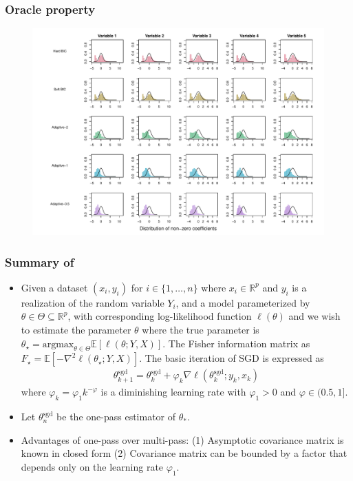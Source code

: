 \documentclass{beamer}
\newcommand{\expect}[1]{\mathbb{E}[#1]}
\newcommand{\exsgd}{\theta^{\text{sgd}}}
\newcommand{\amax}{\text{argmax}}
\begin{document}
\begin{frame}
  \frametitle{Oracle property}
  \begin{figure}[t!]
  \centering
  \captionsetup{width=.9\linewidth}
  \includegraphics[scale=0.4]{oracle_n100_family-binomial_p40_s5_rho0.pdf}
\end{figure}
\end{frame}



\begin{frame}
  \frametitle{Summary of~\citet{chee:2023}}
  \begin{itemize}
  \item Given a dataset \((x_i, y_i)\) for $i\in\{1,\dots,n\}$ where \(x_i \in \mathbb{R}^p\) and \(y_i\) is a realization of the random variable \(Y_i\), and a model parameterized by \(\theta \in \Theta \subseteq \mathbb{R}^p\), with corresponding log-likelihood function $\ell(\theta)$ and we wish to estimate the parameter $\theta$ where the true parameter is $\theta_\star = \amax_{\theta\in\Theta} \expect{\ell(\theta; Y, X)}$. The Fisher information matrix as $F_\star = \expect{-\nabla^2 \ell(\theta_\star; Y, X)}$. The basic iteration of SGD is expressed as
    \begin{align}
      \exsgd_{k+1} = \exsgd_k + \varphi_k \nabla \ell(\exsgd_k; y_k, x_k)\nonumber
    \end{align}
    where \(\varphi_k = \varphi_1 k^{-\varphi}\) is a diminishing learning rate with $\varphi_1 > 0$ and $\varphi\in(0.5, 1]$.
  \item Let $\exsgd_n$ be the one-pass estimator of $\theta_*$.
  \item Advantages of one-pass over multi-pass: (1) Asymptotic covariance matrix is known in closed form (2) Covariance matrix can be bounded by a factor that depends only on the learning rate $\varphi_1$.
  \end{itemize}
\end{frame}
\end{document}

